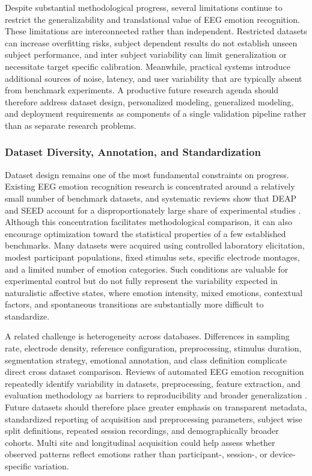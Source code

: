 \documentclass[ASNA,twocolumn]{USG}
\begin{document}
Despite substantial methodological progress, several limitations continue to restrict the generalizability and translational value of EEG emotion recognition. These limitations are interconnected rather than independent. Restricted datasets can increase overfitting risks, subject dependent results do not establish unseen subject performance, and inter subject variability can limit generalization or necessitate target specific calibration. Meanwhile, practical systems introduce additional sources of noise, latency, and user variability that are typically absent from benchmark experiments. A productive future research agenda should therefore address dataset design, personalized modeling, generalized modeling, and deployment requirements as components of a single validation pipeline rather than as separate research problems.

\subsubsection{Dataset Diversity, Annotation, and Standardization}
\label{subsubsec:dataset_challenges}

Dataset design remains one of the most fundamental constraints on progress. Existing EEG emotion recognition research is concentrated around a relatively small number of benchmark datasets, and systematic reviews show that DEAP and SEED account for a disproportionately large share of experimental studies \cite{prabowo2023systematic}. Although this concentration facilitates methodological comparison, it can also encourage optimization toward the statistical properties of a few established benchmarks. Many datasets were acquired using controlled laboratory elicitation, modest participant populations, fixed stimulus sets, specific electrode montages, and a limited number of emotion categories. Such conditions are valuable for experimental control but do not fully represent the variability expected in naturalistic affective states, where emotion intensity, mixed emotions, contextual factors, and spontaneous transitions are substantially more difficult to standardize.

A related challenge is heterogeneity across databases. Differences in sampling rate, electrode density, reference configuration, preprocessing, stimulus duration, segmentation strategy, emotional annotation, and class definition complicate direct cross dataset comparison. Reviews of automated EEG emotion recognition repeatedly identify variability in datasets, preprocessing, feature extraction, and evaluation methodology as barriers to reproducibility and broader generalization \cite{vempati2023systematic}. Future datasets should therefore place greater emphasis on transparent metadata, standardized reporting of acquisition and preprocessing parameters, subject wise split definitions, repeated session recordings, and demographically broader cohorts. Multi site and longitudinal acquisition could help assess whether observed patterns reflect emotions rather than participant-, session-, or device-specific variation.
\end{document}
